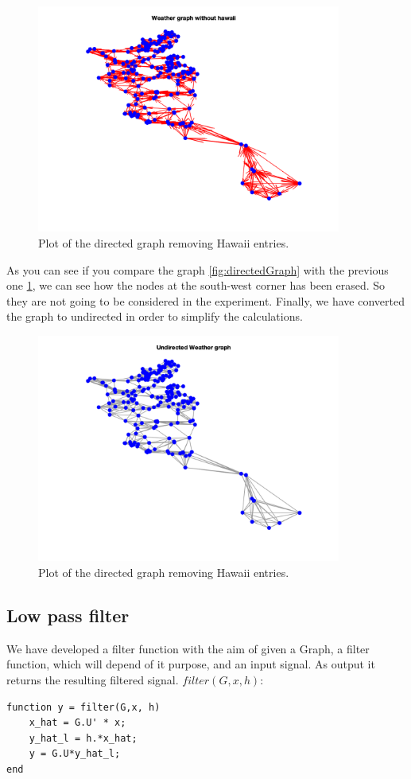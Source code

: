 \documentclass[12pt]{article}
\begin{document}
\begin{figure}[H]
	\centering
	\includegraphics[width=10cm]{images/3.png}
	\caption{Plot of the directed graph removing Hawaii entries.}
	\label{fig:excludedHawaiiGraph}
\end{figure}

As you can see if you compare the graph \ref{fig:directedGraph} with the previous one \ref{fig:excludedHawaiiGraph}, we can see how the nodes at the south-west corner has been erased. So they are not going to be considered in the experiment. Finally, we have converted the graph to undirected in order to simplify the calculations.

\begin{figure}[H]
	\centering
	\includegraphics[width=10cm]{images/4.png}
	\caption{Plot of the directed graph removing Hawaii entries.}
	\label{fig:undirectedGraph}
\end{figure}

\subsection{Low pass filter}
\justifying
We have developed a filter function with the aim of given a Graph, a filter function, which will depend of it purpose, and an input signal. As output it returns the resulting filtered signal. $filter(G,x, h)$:
\label{code:CNScoring}
\begin{lstlisting}
function y = filter(G,x, h)
    x_hat = G.U' * x;
    y_hat_l = h.*x_hat;
    y = G.U*y_hat_l;
end
\end{lstlisting}
\justifying
\end{document}
